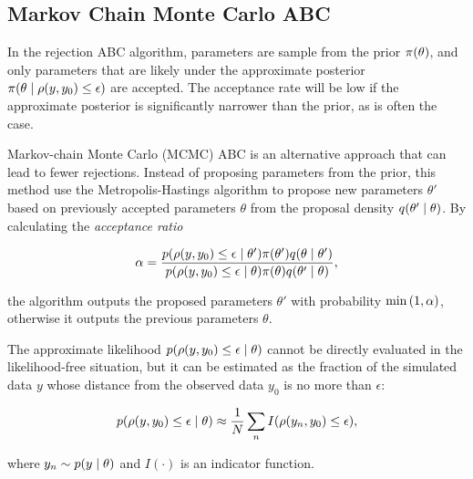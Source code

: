 \subsection{Markov Chain Monte Carlo ABC}\label{sec:mcmc_abc}

In the rejection ABC algorithm, parameters are sample from the prior $\pi \qty(\theta)$, and only parameters that are likely under the approximate posterior $\pi \qty(\theta \mid \rho \qty(y, y_0 ) \leq \epsilon )$ are accepted. The acceptance rate will be low if the approximate posterior is significantly narrower than the prior, as is often the case. %

Markov-chain Monte Carlo (MCMC) ABC is an alternative approach that can lead to fewer rejections. Instead of proposing parameters from the prior, this method use the Metropolis-Hastings algorithm to propose new parameters $\theta'$ based on previously accepted parameters $\theta$ from the proposal density $q \qty(\theta' \mid \theta)$. By calculating the \textit{acceptance ratio}

\begin{equation}
    \alpha = \frac{p \qty(\rho \qty(y, y_0 ) \leq \epsilon \mid \theta') \pi\qty(\theta') q \qty(\theta \mid \theta')  }{p \qty(\rho \qty(y, y_0) \leq \epsilon \mid \theta) \pi\qty(\theta) q \qty(\theta' \mid \theta) },
\end{equation}

the algorithm outputs the proposed parameters $\theta'$ with probability $\min \qty(1, \alpha)$, otherwise it outputs the previous parameters $\theta$. 

The approximate likelihood $p \qty(\rho \qty(y, y_0 ) \leq \epsilon \mid \theta)$ cannot be directly evaluated in the likelihood-free situation, but it can be estimated as the fraction of the simulated data $y$ whose distance from the observed data $y_0$ is no more than $\epsilon$:

\begin{equation}
    p \qty(\rho \qty(y, y_0) \leq \epsilon \mid \theta) \approx \frac{1}{N} \sum_n I \qty(\rho \qty(y_n, y_0) \leq \epsilon),
\end{equation}

where $y_n \sim p \qty(y \mid \theta)$ and $I(\cdot)$ is an indicator function. %

